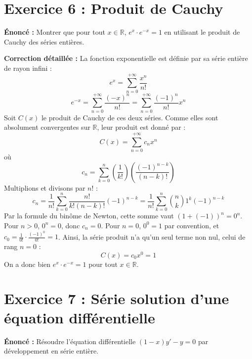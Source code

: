 \documentclass{report}
\begin{document}
\newpage
\chapter*{Exercice 6 : Produit de Cauchy}

\textbf{Énoncé :}
Montrer que pour tout $x \in \mathbb{R}$, $e^x \cdot e^{-x} = 1$ en utilisant le produit de Cauchy des séries entières.

\textbf{Correction détaillée :}
La fonction exponentielle est définie par sa série entière de rayon infini :
$$ e^x = \sum_{n=0}^{+\infty} \frac{x^n}{n!} $$
$$ e^{-x} = \sum_{n=0}^{+\infty} \frac{(-x)^n}{n!} = \sum_{n=0}^{+\infty} \frac{(-1)^n}{n!} x^n $$
Soit $C(x)$ le produit de Cauchy de ces deux séries. Comme elles sont absolument convergentes sur $\mathbb{R}$, leur produit est donné par :
$$ C(x) = \sum_{n=0}^{+\infty} c_n x^n $$
où
$$ c_n = \sum_{k=0}^n \left( \frac{1}{k!} \right) \left( \frac{(-1)^{n-k}}{(n-k)!} \right) $$
Multiplions et divisons par $n!$ :
$$ c_n = \frac{1}{n!} \sum_{k=0}^n \frac{n!}{k!(n-k)!} (-1)^{n-k} = \frac{1}{n!} \sum_{k=0}^n \binom{n}{k} 1^k (-1)^{n-k} $$
Par la formule du binôme de Newton, cette somme vaut $(1 + (-1))^n = 0^n$.
Pour $n > 0$, $0^n = 0$, donc $c_n = 0$.
Pour $n = 0$, $0^0 = 1$ par convention, et $c_0 = \frac{1}{0!} \cdot \frac{(-1)^0}{0!} = 1$.
Ainsi, la série produit n'a qu'un seul terme non nul, celui de rang $n=0$ :
$$ C(x) = c_0 x^0 = 1 $$
On a donc bien $e^x \cdot e^{-x} = 1$ pour tout $x \in \mathbb{R}$.

\newpage
\chapter*{Exercice 7 : Série solution d'une équation différentielle}

\textbf{Énoncé :}
Résoudre l'équation différentielle $(1-x)y' - y = 0$ par développement en série entière.
\end{document}
